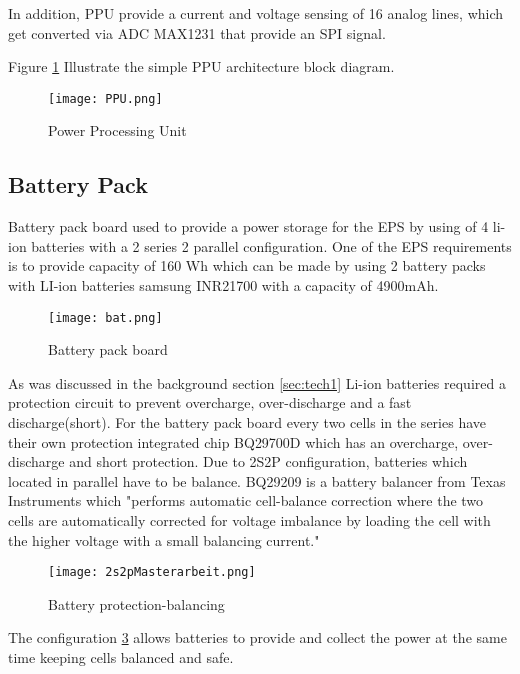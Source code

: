   In addition, PPU provide a current and voltage sensing of 16 analog lines,  which get converted via ADC MAX1231 that provide an SPI signal. 
  
  Figure \ref{fig: PPU} Illustrate the simple PPU architecture block diagram. 
  
  \begin{figure}[h]
  	\centering
  	\texttt{[image: PPU.png]}
  	\caption{Power Processing Unit}
  	\label{fig: PPU}
  \end{figure}
  
     \subsection{Battery Pack}
  
 Battery pack board used to provide a power storage for the EPS by using of 4 li-ion batteries with a 2 series 2 parallel configuration. One of the EPS requirements is to provide capacity of 160 Wh which can be made by using 2 battery packs with LI-ion batteries samsung INR21700 with a capacity of 4900mAh.
 
 \begin{figure}[h]
 	\centering
 	\texttt{[image: bat.png]}
 	\caption{Battery pack board}
 	\label{fig: bat}
 \end{figure}
 
  As was discussed in the background section \ref{sec:tech1} Li-ion batteries required a protection circuit to prevent overcharge, over-discharge and a fast discharge(short). For the battery pack board every two cells in the series have their own protection integrated chip BQ29700D which has an overcharge, over-discharge and short protection. Due to 2S2P configuration, batteries which located in parallel have to be balance. BQ29209 is a battery balancer from Texas Instruments which \cite{23}"performs automatic cell-balance correction where the two cells are automatically corrected for voltage imbalance by loading the cell with the higher voltage with a small balancing current."  
  
  \begin{figure}[h]
  	\centering
  	\texttt{[image: 2s2pMasterarbeit.png]}
  	\caption{Battery protection-balancing}
  	\label{fig: Bat_prot_bal}
  \end{figure}
  
  The configuration \ref{fig: Bat_prot_bal} allows batteries to provide and collect the power at the same time keeping cells balanced and safe.
  
